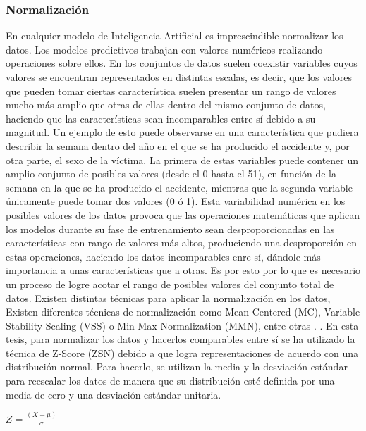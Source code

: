 \documentclass{uathesis-es}
\begin{document}
{	\subsubsection{Normalización}
	
	En cualquier modelo de Inteligencia Artificial es imprescindible normalizar los datos. Los modelos predictivos trabajan con valores numéricos realizando operaciones sobre ellos. En los conjuntos de datos suelen coexistir variables cuyos valores se encuentran representados en distintas escalas, es decir, que los valores que pueden tomar ciertas característica suelen presentar un rango de valores mucho más amplio que otras de ellas dentro del mismo conjunto de datos, haciendo que las características sean incomparables entre sí debido a su magnitud. Un ejemplo de esto puede observarse en una característica que pudiera describir la semana dentro del año en el que se ha producido el accidente y, por otra parte, el sexo de la víctima. La primera de estas variables puede contener un amplio conjunto de posibles valores (desde el 0 hasta el 51), en función de la semana en la que se ha producido el accidente, mientras que la segunda variable únicamente puede tomar dos valores (0 ó 1). Esta variabilidad numérica en los posibles valores de los datos provoca que las operaciones matemáticas que aplican los modelos durante su fase de entrenamiento sean desproporcionadas en las características con rango de valores más altos, produciendo una desproporción en estas operaciones, haciendo los datos incomparables enre sí, dándole más importancia a unas características que a otras. Es por esto por lo que es necesario un proceso de logre acotar el rango de posibles valores del conjunto total de datos. Existen distintas técnicas para aplicar la normalización en los datos, Existen diferentes técnicas de normalización como Mean Centered (MC), Variable Stability Scaling (VSS) o Min-Max Normalization (MMN), entre otras \cite{DataNormalizationInvestigation}. . En esta tesis, para normalizar los datos y hacerlos comparables entre sí se ha utilizado la técnica de Z-Score (ZSN) debido a que logra representaciones de acuerdo con una distribución normal. Para hacerlo, se utilizan la media y la desviación estándar para reescalar los datos de manera que su distribución esté definida por una media de cero y una desviación estándar unitaria.
	
	
	\begin{center}
		$Z = \frac{(X - \mu)}{\sigma}$
	\end{center}
	
}
\end{document}
